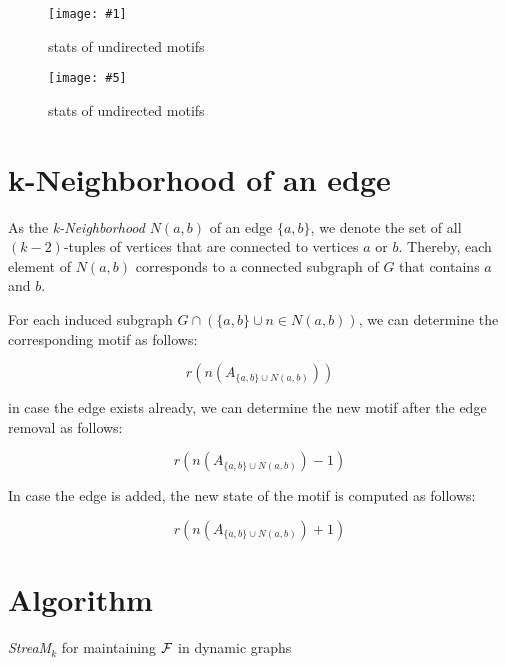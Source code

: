 \documentclass{article}
\newcommand{\eqn}[1]{
	\begin{equation*}
		#1
	\end{equation*}
}
\newcommand{\imgs}[8]{
	\begin{figure}[!tbh]
		\begin{minipage}[b]{#4\textwidth}
			\centering
			\texttt{[image: \#1]}
			\caption{#3}
			\label{#2}
		\end{minipage}
		\hfill
		\begin{minipage}[b]{#8\textwidth}
			\centering
			\texttt{[image: \#5]}
			\caption{#7}
			\label{#6}
		\end{minipage}
	\end{figure}
}
\begin{document}
\imgs{um-stats}{fig:um-stats}{stats of undirected motifs}{0.4}{um-stats-labeled}{fig:um-stats-labeled}{stats of undirected motifs}{0.4}





\section{k-Neighborhood of an edge}

As the \emph{k-Neighborhood} $N(a,b)$ of an edge $\{a,b\}$, we denote the set of all $(k-2)$-tuples of vertices that are connected to vertices $a$ or $b$.
Thereby, each element of $N(a,b)$ corresponds to a connected subgraph of $G$ that contains $a$ and $b$.

For each induced subgraph $G \cap (\{a,b\} \cup n \in N(a,b))$, we can determine the corresponding motif as follows:

\eqn{r(n(A_{\{a,b\} \cup N(a,b)}))}

in case the edge exists already, we can determine the new motif after the edge removal as follows:

\eqn{r(n(A_{\{a,b\} \cup N(a,b)})-1)}

In case the edge is added, the new state of the motif is computed as follows:

\eqn{r(n(A_{\{a,b\} \cup N(a,b)})+1)}





\section{Algorithm}


\newcommand{\mcount}{{\cal F}}
\newcommand{\mcountof}[1]{{\cal F}(\motif{#1})}
\newcommand{\mcountofat}[2]{{\cal F}_{#2}(\motif{#1})}

\newcommand{\operation}{{\cal O}}
\newcommand{\signature}{{\cal S}}
\newcommand{\signatureofabcd}{\signature(a,b,c,d)}


\begin{algorithm}[!htb]
	\caption{\emph{StreaM$_k$} for maintaining $\mcount$ in dynamic graphs}
	\label{alg:u}
\end{algorithm}
\end{document}
